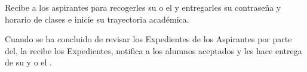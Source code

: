 \begin{PDescripcion}
\begin{enumerate}
		  Recibe a los aspirantes para recogerles su  o el y entregarles su contraseña y horario de clases e inicie su trayectoria académica.
		
		 Cuando se ha concluido de revisar los Expedientes de los Aspirantes por parte del, la  recibe los Expedientes, notifica a los alumnos aceptados y les hace entrega de su  y  o el .
		
	\end{enumerate}
\end{PDescripcion}